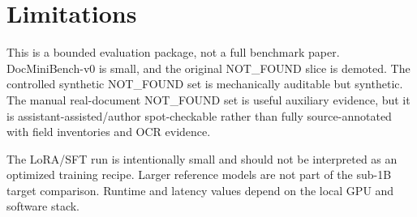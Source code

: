 \section{Limitations}

This is a bounded evaluation package, not a full benchmark paper. DocMiniBench-v0
is small, and the original NOT\_FOUND slice is demoted. The controlled synthetic
NOT\_FOUND set is mechanically auditable but synthetic. The manual real-document
NOT\_FOUND set is useful auxiliary evidence, but it is
assistant-assisted/author spot-checkable rather than fully source-annotated with
field inventories and OCR evidence.

The LoRA/SFT run is intentionally small and should not be interpreted as an
optimized training recipe. Larger reference models are not part of the sub-1B
target comparison. Runtime and latency values depend on the local GPU and
software stack.
